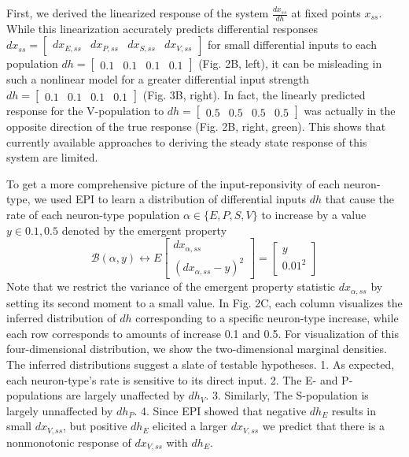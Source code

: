 \documentclass[11pt]{article}
\begin{document}
First, we derived the linearized response of the system $\frac{dx_{ss}}{dh}$ at fixed points $x_{ss}$.  
While this linearization accurately predicts differential responses $dx_{ss} = \begin{bmatrix} dx_{E,ss} & dx_{P,ss} & dx_{S,ss} & dx_{V,ss} \end{bmatrix}$  for small differential inputs to each population $dh = \begin{bmatrix} 0.1 & 0.1 & 0.1 & 0.1 \end{bmatrix}$ (Fig. 2B, left), it can be misleading in such a nonlinear model for a greater differential input strength $dh = \begin{bmatrix} 0.1 & 0.1 & 0.1 & 0.1 \end{bmatrix}$ (Fig. 3B, right). In fact, the linearly predicted response for the V-population to $dh = \begin{bmatrix} 0.5 & 0.5 & 0.5 & 0.5 \end{bmatrix}$ was actually in the opposite direction of the true response (Fig. 2B, right, green).  This shows that currently available approaches  to deriving the steady state response of this system are limited.

To get a more comprehensive picture of the input-reponsivity of each neuron-type, we used EPI to learn a distribution of differential inputs $dh$ that cause the rate of each neuron-type population $\alpha \in \{E, P, S, V \}$ to increase by a value $y \in {0.1, 0.5}$ denoted by the emergent property 
\begin{equation}
\mathcal{B}(\alpha, y) \leftrightarrow 
E \begin{bmatrix} dx_{\alpha,ss} \\ (dx_{\alpha,ss} - y)^2 \end{bmatrix} = \begin{bmatrix} y \\ 0.01^2 \end{bmatrix}
\end{equation}
Note that we restrict the variance of the emergent property statistic $dx_{\alpha,ss}$ by setting its second moment to a small value. In Fig. 2C, each column visualizes the inferred distribution of $dh$ corresponding to a specific neuron-type increase, while each row corresponds to amounts of increase 0.1 and 0.5. For visualization of this four-dimensional distribution, we show the two-dimensional marginal densities.  The inferred distributions suggest a slate of testable hypotheses. 1. As expected, each neuron-type's rate is sensitive to its direct input.  2. The E- and P-populations are largely unaffected by $dh_V$. 3. Similarly, The S-population is largely unnaffected by $dh_P$. 4. Since EPI showed that negative $dh_E$ results in small $dx_{V,ss}$, but positive $dh_E$ elicited a larger $dx_{V,ss}$ we predict that there is a nonmonotonic response of $dx_{V,ss}$ with $dh_{E}$.
\end{document}
